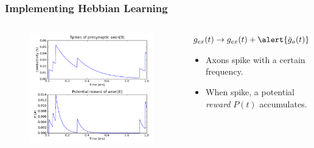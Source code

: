 \documentclass{beamer}
\begin{document}
	\begin{frame} 
		\frametitle{Implementing Hebbian Learning}
		\begin{columns} 
				\begin{figure} 
					\centering
					\includegraphics[width=\textwidth]{graphics/demo/fig01} 
				\end{figure} 
				\begin{block}{$g_{ex}(t) \rightarrow g_{ex}(t) + \alert{\bar{g}_a(t)}$}
					\hspace{5 mm}
					\begin{itemize} 
						\item Axons spike with a certain frequency. \\
						\hspace{5 mm}
						\item When spike, a \alert{potential \emph{reward} $P(t)$} accumulates. 
					\end{itemize}
				\end{block}
		\end{columns}
	\end{frame}
	
\end{document}
